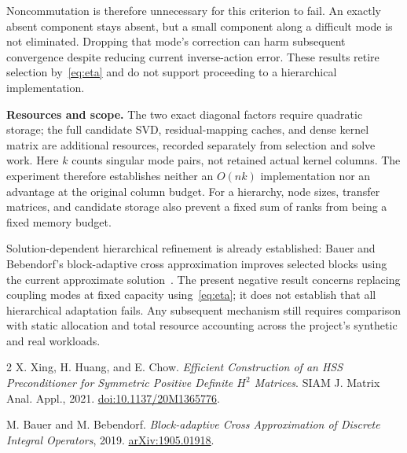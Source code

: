 \documentclass[10pt]{article}
\begin{document}
Noncommutation is therefore unnecessary for this criterion to fail. An exactly
absent component stays absent, but a small component along a difficult mode is
not eliminated. Dropping that mode's correction can harm subsequent convergence
despite reducing current inverse-action error. These results retire selection
by~\eqref{eq:eta} and do not support proceeding to a hierarchical implementation.

\textbf{Resources and scope.}
The two exact diagonal factors require quadratic storage; the full
candidate SVD, residual-mapping caches, and dense kernel matrix are additional
resources, recorded separately from selection and solve work. Here $k$
counts singular mode pairs, not retained actual kernel columns. The experiment
therefore establishes neither an $O(nk)$ implementation nor an advantage at
the original column budget. For a hierarchy, node sizes, transfer matrices,
and candidate storage also prevent a fixed sum of ranks from being a fixed
memory budget.

Solution-dependent hierarchical refinement is already established: Bauer and
Bebendorf's block-adaptive cross approximation improves selected blocks using
the current approximate solution~\cite{bauer2019}. The present negative result
concerns replacing coupling modes at fixed capacity using~\eqref{eq:eta}; it
does not establish that all hierarchical adaptation fails. Any subsequent
mechanism still requires comparison with static allocation and total resource
accounting across the project's synthetic and real workloads.

\begin{thebibliography}{2}
\small
{}
X. Xing, H. Huang, and E. Chow.
\emph{Efficient Construction of an HSS Preconditioner for Symmetric Positive
Definite $H^2$ Matrices}. SIAM J. Matrix Anal. Appl., 2021.
\href{https://doi.org/10.1137/20M1365776}{doi:10.1137/20M1365776}.

M. Bauer and M. Bebendorf.
\emph{Block-adaptive Cross Approximation of Discrete Integral Operators}, 2019.
\href{https://arxiv.org/abs/1905.01918}{arXiv:1905.01918}.
\end{thebibliography}
\end{document}
